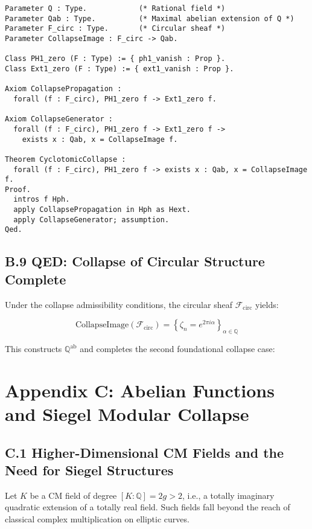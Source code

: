 \documentclass[11pt]{article}
\begin{document}
\begin{lstlisting}[language=Coq, caption={Coq Encoding: Cyclotomic Collapse}]
Parameter Q : Type.            (* Rational field *)
Parameter Qab : Type.          (* Maximal abelian extension of Q *)
Parameter F_circ : Type.       (* Circular sheaf *)
Parameter CollapseImage : F_circ -> Qab.

Class PH1_zero (F : Type) := { ph1_vanish : Prop }.
Class Ext1_zero (F : Type) := { ext1_vanish : Prop }.

Axiom CollapsePropagation :
  forall (f : F_circ), PH1_zero f -> Ext1_zero f.

Axiom CollapseGenerator :
  forall (f : F_circ), PH1_zero f -> Ext1_zero f ->
    exists x : Qab, x = CollapseImage f.

Theorem CyclotomicCollapse :
  forall (f : F_circ), PH1_zero f -> exists x : Qab, x = CollapseImage f.
Proof.
  intros f Hph.
  apply CollapsePropagation in Hph as Hext.
  apply CollapseGenerator; assumption.
Qed.
\end{lstlisting}

\subsection*{B.9 QED: Collapse of Circular Structure Complete}

Under the collapse admissibility conditions, the circular sheaf \( \mathcal{F}_{\mathrm{circ}} \) yields:

\[
\text{CollapseImage}(\mathcal{F}_{\mathrm{circ}}) = \left\{ \zeta_n = e^{2\pi i \alpha} \right\}_{\alpha \in \mathbb{Q}}
\]

This constructs \( \mathbb{Q}^{\mathrm{ab}} \) and completes the second foundational collapse case:



\appendix
\section*{Appendix C: Abelian Functions and Siegel Modular Collapse}

\subsection*{C.1 Higher-Dimensional CM Fields and the Need for Siegel Structures}

Let \( K \) be a CM field of degree \( [K : \mathbb{Q}] = 2g > 2 \), i.e., a totally imaginary quadratic extension of a totally real field.  
Such fields fall beyond the reach of classical complex multiplication on elliptic curves.
\end{document}
